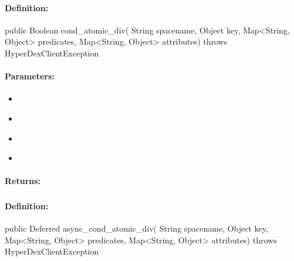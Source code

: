 \paragraph{Definition:}
\begin{javacode}
public Boolean cond_atomic_div(
        String spacename,
        Object key,
        Map<String, Object> predicates,
        Map<String, Object> attributes) throws HyperDexClientException
\end{javacode}

\paragraph{Parameters:}
\begin{itemize}[noitemsep]
\item {}\\

\item {}\\

\item {}\\

\item {}\\

\end{itemize}

\paragraph{Returns:}


\pagebreak
\subsubsection{}
\label{api:java:async_cond_atomic_div}


\paragraph{Definition:}
\begin{javacode}
public Deferred async_cond_atomic_div(
        String spacename,
        Object key,
        Map<String, Object> predicates,
        Map<String, Object> attributes) throws HyperDexClientException
\end{javacode}

